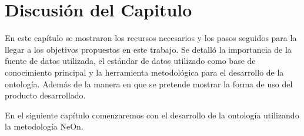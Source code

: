 %

\section{Discusión del Capitulo}

En este capítulo se mostraron los recursos necesarios y los pasos seguidos para la llegar a los objetivos propuestos en este trabajo. Se detalló la importancia de la fuente de datos utilizada, el estándar de datos utilizado como base de conocimiento principal y la herramienta metodológica para el desarrollo de la ontología. Además de la manera en que se pretende mostrar la forma de uso del producto desarrollado.

En el siguiente capítulo comenzaremos con el desarrollo de la ontología utilizando la metodología NeOn.




